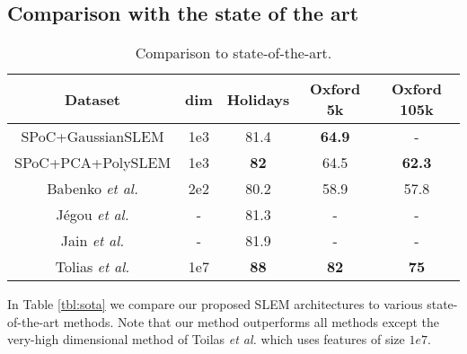 \subsection{Comparison with the state of the art}
\label{sec:sota}
\begin{table}[!t]
  \centering
  \caption{Comparison to state-of-the-art.}
  \label{tbl:sota}
  \setlength{\tabcolsep}{.5em}
  \begin{tabular}{ccccc}
    \toprule
    Dataset & dim &\textbf{Holidays} & \textbf{Oxford 5k} & \textbf{Oxford 105k}\\
    \midrule
    SPoC+GaussianSLEM                           & 1e3  &  81.4           &  \textbf{64.9}  &   -  \\
    SPoC+PCA+PolySLEM                           & 1e3  &  \textbf{82}    &   64.5  &  \textbf{62.3} \\
    Babenko \textit{et al.} \cite{babenko15}     & 2e2  &  80.2           &   58.9  &  57.8 \\
    J\'egou \textit{et al.} \cite{sota1}         & -    &  81.3           &    -    &   -   \\
    Jain \textit{et al. } \cite{JaJeGro11}       &   -  &  81.9           &    -    &   -   \\
    \midrule
    Tolias \textit{et al.} \cite{Tolias13}      & 1e7  &  \textbf{88}     &  \textbf{82}    &  \textbf{75}   \\
    \bottomrule
  \end{tabular}
  \label{tab:sota}
\end{table}

In Table \ref{tbl:sota} we compare our proposed SLEM architectures to various state-of-the-art methods. Note that our method outperforms all methods except the very-high dimensional method of Toilas \textit{et al.} \cite{Tolias13} which uses features of size $1e7$.


